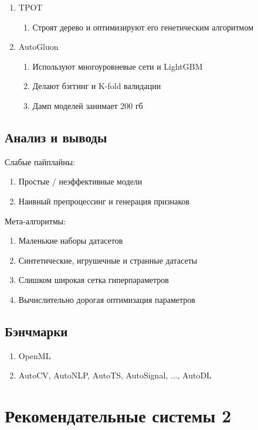 \documentclass[a4paper, 12pt]{article}
\begin{document}
\begin{enumerate}
    \item TPOT
    \begin{enumerate}
        \item Строят дерево и оптимизируют его генетическим алгоритмом
    \end{enumerate}
    \item AutoGluon
    \begin{enumerate}
        \item Используют многоуровневые сети и LightGBM
        \item Делают бэггинг и K-fold валидации
        \item Дамп моделей занимает 200 гб
    \end{enumerate}
\end{enumerate}

\subsection{Анализ и выводы}

Слабые пайплайны:

\begin{enumerate}
    \item Простые / неэффективные модели
    \item Наивный препроцессинг и генерация признаков 
\end{enumerate}

Мета-алгоритмы:

\begin{enumerate}
    \item Маленькие наборы датасетов
    \item Синтетические, игрушечные и странные датасеты
    \item Слишком широкая сетка гиперпараметров
    \item Вычислительно дорогая оптимизация параметров
\end{enumerate}

\subsection{Бэнчмарки}

\begin{enumerate}
    \item OpenML
    \item AutoCV, AutoNLP, AutoTS, AutoSignal, ..., AutoDL
\end{enumerate}
\pagebreak

\section{Рекомендательные системы 2}
\end{document}
